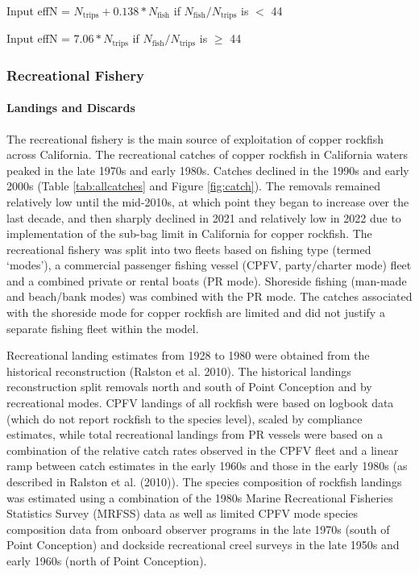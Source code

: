 \documentclass[11pt,
  english,
  letterpaper,
]{article}
\begin{document}
\begin{centering}

Input effN = $N_{\text{trips}} + 0.138 * N_{\text{fish}}$ if $N_{\text{fish}}/N_{\text{trips}}$ is $<$ 44

Input effN = $7.06 * N_{\text{trips}}$ if $N_{\text{fish}}/N_{\text{trips}}$ is $\geq$ 44

\end{centering}

\hypertarget{recreational-fishery}{%
\subsubsection{Recreational Fishery}\label{recreational-fishery}}

\hypertarget{landings-and-discards-1}{%
\paragraph{Landings and Discards}\label{landings-and-discards-1}}

\hfill\break

The recreational fishery is the main source of exploitation of copper rockfish across California. The recreational catches of copper rockfish in California waters peaked in the late 1970s and early 1980s. Catches declined in the 1990s and early 2000s (Table \ref{tab:allcatches} and Figure \ref{fig:catch}). The removals remained relatively low until the mid-2010s, at which point they began to increase over the last decade, and then sharply declined in 2021 and relatively low in 2022 due to implementation of the sub-bag limit in California for copper rockfish. The recreational fishery was split into two fleets based on fishing type (termed `modes'), a commercial passenger fishing vessel (CPFV, party/charter mode) fleet and a combined private or rental boats (PR mode). Shoreside fishing (man-made and beach/bank modes) was combined with the PR mode. The catches associated with the shoreside mode for copper rockfish are limited and did not justify a separate fishing fleet within the model.

Recreational landing estimates from 1928 to 1980 were obtained from the historical reconstruction (Ralston et al. 2010). The historical landings reconstruction split removals north and south of Point Conception and by recreational modes. CPFV landings of all rockfish were based on logbook data (which do not report rockfish to the species level), scaled by compliance estimates, while total recreational landings from PR vessels were based on a combination of the relative catch rates observed in the CPFV fleet and a linear ramp between catch estimates in the early 1960s and those in the early 1980s (as described in Ralston et al. (2010)). The species composition of rockfish landings was estimated using a combination of the 1980s Marine Recreational Fisheries Statistics Survey (MRFSS) data as well as limited CPFV mode species composition data from onboard observer programs in the late 1970s (south of Point Conception) and dockside recreational creel surveys in the late 1950s and early 1960s (north of Point Conception).
\end{document}
